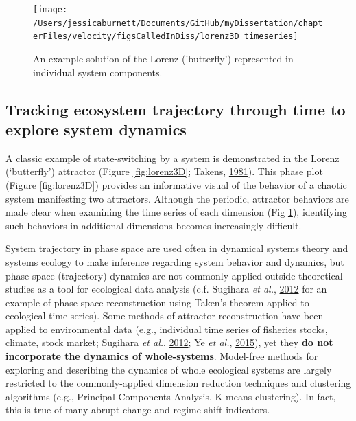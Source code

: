 \documentclass[12pt,twoside,openany]{reedthesis}
\begin{document}
\begin{figure}[bth]

{\centering \texttt{[image: /Users/jessicaburnett/Documents/GitHub/myDissertation/chapterFiles/velocity/figsCalledInDiss/lorenz3D\_timeseries]} 

}

\caption{An example solution of the Lorenz ('butterfly') represented in individual system components.}\label{fig:lorenz3Dts}
\end{figure}
\hypertarget{tracking-ecosystem-trajectory-through-time-to-explore-system-dynamics}{%
\subsection{Tracking ecosystem trajectory through time to explore system dynamics}\label{tracking-ecosystem-trajectory-through-time-to-explore-system-dynamics}}

A classic example of state-switching by a system is demonstrated in the Lorenz (`butterfly') attractor (Figure \ref{fig:lorenz3D}; Takens, \protect\hyperlink{ref-takens1981detecting}{1981}). This phase plot (Figure \ref{fig:lorenz3D}) provides an informative visual of the behavior of a chaotic system manifesting two attractors. Although the periodic, attractor behaviors are made clear when examining the time series of each dimension (Fig \ref{fig:lorenz3Dts}), identifying such behaviors in additional dimensions becomes increasingly difficult.

System trajectory in phase space are used often in dynamical systems theory and systems ecology to make inference regarding system behavior and dynamics, but phase space (trajectory) dynamics are not commonly applied outside theoretical studies as a tool for ecological data analysis (c.f. Sugihara \emph{et al.}, \protect\hyperlink{ref-sugihara2012detecting}{2012} for an example of phase-space reconstruction using Taken's theorem applied to ecological time series). Some methods of attractor reconstruction have been applied to environmental data (e.g., individual time series of fisheries stocks, climate, stock market; Sugihara \emph{et al.}, \protect\hyperlink{ref-sugihara2012detecting}{2012}; Ye \emph{et al.}, \protect\hyperlink{ref-ye2015equation}{2015}), yet they \textbf{do not incorporate the dynamics of whole-systems}. Model-free methods for exploring and describing the dynamics of whole ecological systems are largely restricted to the commonly-applied dimension reduction techniques and clustering algorithms (e.g., Principal Components Analysis, K-means clustering). In fact, this is true of many abrupt change and regime shift indicators.
\end{document}
